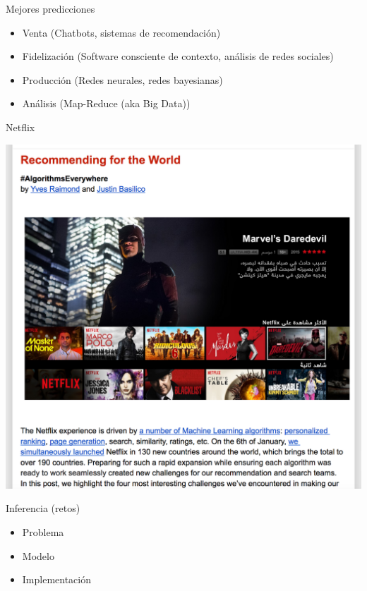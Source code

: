 \documentclass{beamer}
\begin{document}
\begin{frame}
    \begin{center}
        \large Mejores predicciones
    \end{center}
    \begin{itemize}
        \item Venta (Chatbots, sistemas de recomendación)
        \item Fidelización (Software consciente de contexto, análisis de redes sociales)
        \item Producción (Redes neurales, redes bayesianas)
        \item Análisis (Map-Reduce (aka Big Data))
    \end{itemize}
\end{frame}

\begin{frame}{Netflix}
    \begin{center}
        \includegraphics[width=0.9\linewidth]{Images/netflix}
    \end{center}
\end{frame}

\begin{frame}{Inferencia (retos)}
    \begin{itemize}
        \item Problema
        \item Modelo
        \item Implementación
    \end{itemize}
\end{frame}
\end{document}
